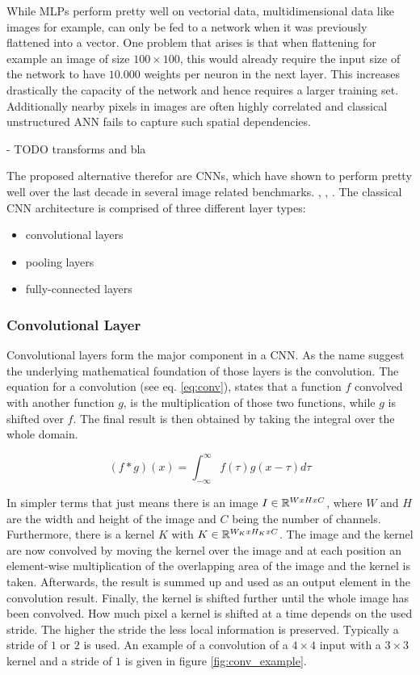 While \acp{MLP} perform pretty well on vectorial data, multidimensional data like images for example, can only be fed to a network when it was previously flattened into a vector.
One problem that arises is that when flattening for example an image of size $100 \times 100$, this would already require the input size of the network to have $10.000$ weights per neuron in the next layer.
This increases drastically the capacity of the network and hence requires a larger training set.
Additionally nearby pixels in images are often highly correlated and classical unstructured \ac{ANN} fails to capture such spatial dependencies. \cite{lecun_lenet}

- TODO transforms and bla

The proposed alternative therefor are \acp{CNN}, which have shown to perform pretty well over the last decade in several image related benchmarks. \cite{inception}, \cite{resnet}, \cite{densenet}.
The classical \ac{CNN} architecture is comprised of three different layer types:

\begin{itemize}
    \item convolutional layers
    \item pooling layers
    \item fully-connected layers
\end{itemize}

\subsubsection{Convolutional Layer}
Convolutional layers form the major component in a \ac{CNN}.
As the name suggest the underlying mathematical foundation of those layers is the convolution.
The equation for a convolution (see eq. \ref{eq:conv}), states that a function $f$ convolved with another function $g$, is the multiplication of those two functions, while $g$ is shifted over $f$.
The final result is then obtained by taking the integral over the whole domain. \cite{dl}

\begin{equation}
    (f * g)(x) = \int_{-\infty}^{\infty}f(\tau)g(x - \tau)d\tau
    \label{eq:conv}
\end{equation}

In simpler terms that just means there is an image $I \in \mathbb{R}^{WxHxC}$, where $W$ and $H$ are the width and height of the image and $C$ being the number of channels.
Furthermore, there is a kernel $K$ with $K \in \mathbb{R}^{W_KxH_KxC}$.
The image and the kernel are now convolved by moving the kernel over the image and at each position an element-wise multiplication of the overlapping area of the image and the kernel is taken.
Afterwards, the result is summed up and used as an output element in the convolution result.
Finally, the kernel is shifted further until the whole image has been convolved.
How much pixel a kernel is shifted at a time depends on the used stride.
The higher the stride the less local information is preserved.
Typically a stride of $1$ or $2$ is used.
An example of a convolution of a $4\times4$ input with a $3\times3$ kernel and a stride of $1$ is given in figure \ref{fig:conv_example}.

